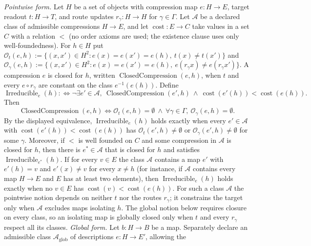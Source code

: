 \begin{theorem}\label{thm:F42}
\emph{Pointwise form.} Let \(H\) be a set of objects with compression
map \(e:H\to E\), target readout \(t:H\to T\), and route updates
\(r_\gamma:H\to H\) for \(\gamma\in\Gamma\). Let \(\mathcal A\) be a declared
class of admissible compressions \(H\to E\), and let
\(\operatorname{cost}:E\to C\) take values in a set \(C\) with a relation \(<\) (no order axioms are used; the existence clause uses only well-foundedness). For \(h\in H\) put
\(\mathcal O_t(e,h):=\{(x,x')\in H^2:e(x)=e(x')=e(h),\ t(x)\ne t(x')\}\) and
\(\mathcal O_\gamma(e,h):=\{(x,x')\in H^2:e(x)=e(x')=e(h),\ e(r_\gamma x)\ne
e(r_\gamma x')\}\). A compression \(e\) is closed for \(h\), written
\(\operatorname{ClosedCompression}(e,h)\), when \(t\) and every
\(e\circ r_\gamma\) are constant on the class \(e^{-1}(e(h))\). Define
\[
  \operatorname{Irreducible}_e(h)
  :\Longleftrightarrow
  \neg\exists e'\in\mathcal A,\
  \operatorname{ClosedCompression}(e',h)
  \ \wedge\
  \operatorname{cost}(e'(h))<\operatorname{cost}(e(h)).
\]
Then
\[
  \operatorname{ClosedCompression}(e,h)
  \iff
  \mathcal O_t(e,h)=\emptyset
  \ \wedge\
  \forall\gamma\in\Gamma,\ \mathcal O_\gamma(e,h)=\emptyset.
\]
By the displayed equivalence, \(\operatorname{Irreducible}_e(h)\) holds
exactly when every \(e'\in\mathcal A\) with
\(\operatorname{cost}(e'(h))<\operatorname{cost}(e(h))\) has
\(\mathcal O_t(e',h)\ne\emptyset\) or \(\mathcal O_\gamma(e',h)\ne\emptyset\)
for some \(\gamma\). Moreover, if \(<\) is well founded on \(C\) and some compression
in \(\mathcal A\) is closed for \(h\), then there is \(e^\ast\in\mathcal A\)
that is closed for \(h\) and satisfies
\(\operatorname{Irreducible}_{e^\ast}(h)\). If for every \(v\in E\) the class \(\mathcal A\) contains a map \(e'\) with
\(e'(h)=v\) and \(e'(x)\ne v\) for every \(x\ne h\) (for instance, if
\(\mathcal A\) contains every map \(H\to E\) and \(E\) has at least two
elements), then
\(\operatorname{Irreducible}_e(h)\) holds exactly when no \(v\in E\) has
\(\operatorname{cost}(v)<\operatorname{cost}(e(h))\). For such a class
\(\mathcal A\) the pointwise notion depends on neither \(t\) nor the routes
\(r_\gamma\); it constrains the target only when \(\mathcal A\) excludes maps
isolating \(h\). The global notion below requires closure on every class, so an
isolating map is globally closed only when \(t\) and every \(r_\gamma\) respect
all its classes.
\emph{Global form.} Let \(b:H\to B\) be a map. Separately declare an admissible
class \(\mathcal A_{\mathrm{glob}}\) of descriptions \(e:H\to E'\), allowing the

\end{theorem}
